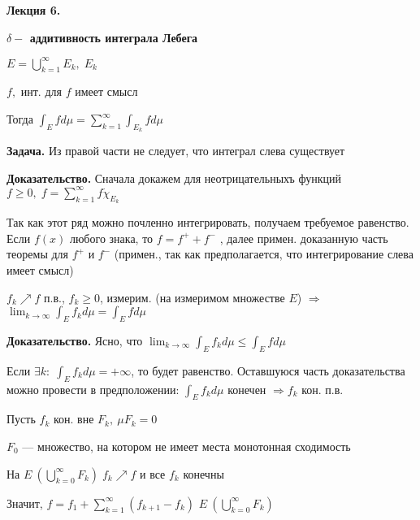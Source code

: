 

\begin{center} \textbf{Лекция 6.}


\textbf{$\delta-$ аддитивность интеграла Лебега}\end{center}

$E = \bigcup_{k=1}^{\infty} E_k, \; E_k$
%
%
%
%
%
%
%
%
%
%
%
%


$f,$ инт. для $f$ имеет смысл

Тогда $\int_E f d\mu = \sum_{k=1}^{\infty} \int_{E_k} f d \mu$

\textbf{Задача.} \quad Из правой части не следует, что интеграл
слева существует

\textbf{Доказательство.} Сначала докажем для неотрицательныхъ
функций $f \geqslant 0, \; f = \sum_{k=1}^{\infty} f \dot
\chi_{E_k}$

Так как этот ряд можно почленно интегрировать, получаем требуемое
равенство. Если $f(x)$ любого знака, то $f = f^+ + f^-$ , далее
примен. доказанную часть теоремы для $f^+$ и $f^-$ (примен., так
как предполагается, что интегрирование слева имеет смысл)


 $f_k \nearrow f$ п.в.,  $f_k \geqslant 0$,
измерим. (на измеримом множестве $E$) $\Rightarrow$ \\ $\lim_{k
\rightarrow \infty} \int_E f_k d \mu = \int_E f d \mu$

\textbf{Доказательство.} \quad Ясно, что $\lim_{k \rightarrow
\infty} \int_E f_k d \mu \leqslant \int_E f d \mu$

Если $\exists k: \; \int_E f_k d \mu = + \infty$, то будет
равенство. Оставшуюся часть доказательства можно провести в
предположении: $\int_E f_k d \mu$ конечен $\Rightarrow f_k$ кон.
п.в.

Пусть $f_k$ кон. вне $F_k, \: \mu F_k = 0$

$F_0$ --- множество, на котором не имеет места монотонная
сходимость

На $E \ (\bigcup_{k=0}^{\infty} F_k) \; f_k \nearrow f$ и все
$f_k$ конечны

Значит, $f = f_1 + \sum_{k=1}^{\infty} (f_{k+1} - f_k)$ $E \
(\bigcup_{k=0}^{\infty} F_k)$

